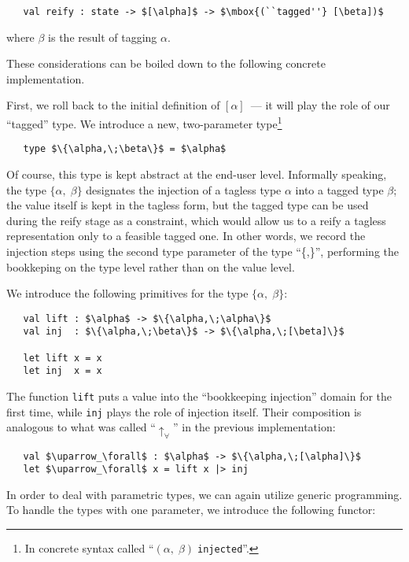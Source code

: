 \begin{lstlisting}
   val reify : state -> $[\alpha]$ -> $\mbox{(``tagged''} [\beta])$
\end{lstlisting}

\noindent where $\beta$ is the result of tagging $\alpha$.

These considerations can be boiled down to the following concrete implementation.

First, we roll back to the initial definition of $[\alpha]$~--- it will play the role of our ``tagged'' type.
We introduce a new, two-parameter type\footnote{In concrete syntax called ``$(\alpha,\;\beta)\;$\lstinline{injected}''.}

\begin{lstlisting}
   type $\{\alpha,\;\beta\}$ = $\alpha$
\end{lstlisting}

Of course, this type is kept abstract at the end-user level. Informally speaking, the type $\{\alpha,\;\beta\}$ designates the
injection of a tagless type $\alpha$ into a tagged type $\beta$; the value itself is kept in the tagless form, but
the tagged type can be used during the reify stage as a constraint, which would allow us to a reify a tagless
representation only to a feasible tagged one. In other words, we record the injection steps using the second
type parameter of the type ``\{,\}'', performing the bookkeping on the type level rather than on the value level.

We introduce the following primitives for the type $\{\alpha,\;\beta\}$:

\begin{lstlisting}
   val lift : $\alpha$ -> $\{\alpha,\;\alpha\}$
   val inj  : $\{\alpha,\;\beta\}$ -> $\{\alpha,\;[\beta]\}$

   let lift x = x
   let inj  x = x
\end{lstlisting}

The function \lstinline{lift} puts a value into the ``bookkeeping injection'' domain for the first time, while
\lstinline{inj} plays the role of injection itself. Their composition is analogous to what was
called ``$\uparrow_\forall$'' in the previous implementation:

\begin{lstlisting}
   val $\uparrow_\forall$ : $\alpha$ -> $\{\alpha,\;[\alpha]\}$
   let $\uparrow_\forall$ x = lift x |> inj
\end{lstlisting}

In order to deal with parametric types, we can again utilize generic programming. To handle the types with
one parameter, we introduce the following functor:

